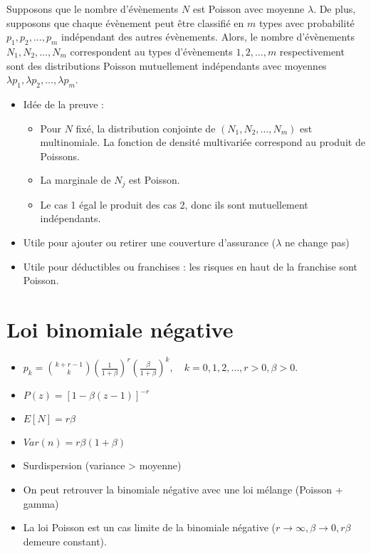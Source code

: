 \begin{theoreme}{}{}
	Supposons que le nombre d'évènements $N$ est Poisson avec moyenne $\lambda$. De plus, supposons que chaque évènement peut être classifié en $m$ types avec probabilité $p_1, p_2, \dots, p_m$ indépendant des autres évènements. Alors, le nombre d'évènements $N_1, N_2, \dots, N_m$ correspondent au types d'évènements $1, 2, \dots, m$ respectivement sont des distributions Poisson mutuellement indépendants avec moyennes $\lambda p_1, \lambda p_2, \dots, \lambda p_m$.
	\tcblower
	\begin{itemize}
		\item Idée de la preuve : 
		\begin{itemize}
			\item Pour $N$ fixé, la distribution conjointe de $(N_1, N_2, \dots, N_m)$ est multinomiale. La fonction de densité multivariée correspond au produit de Poissons. 
			\item La marginale de $N_j$ est Poisson. 
			\item Le cas 1 égal le produit des cas 2, donc ils sont mutuellement indépendants. 
		\end{itemize}
		\item Utile pour ajouter ou retirer une couverture d'assurance ($\lambda$ ne change pas)
		\item Utile pour déductibles ou franchises : les risques en haut de la franchise sont Poisson. 
	\end{itemize}
\end{theoreme}

\section{Loi binomiale négative}

\begin{itemize}
	\item $\displaystyle p_k= \binom{k + r - 1}{k}\left(\frac{1}{1 + \beta}\right)^r \left(\frac{\beta}{1 + \beta}\right)^k, \quad k = 0, 1, 2, \dots, r>0, \beta > 0.$
	\item $\displaystyle P(z) = \left[1 - \beta(z-1)\right]^{-r}$
	\item $E[N] = r\beta$
	\item $Var(n) = r\beta(1 + \beta)$
	\item Surdispersion (variance > moyenne)
	\item On peut retrouver la binomiale négative avec une loi mélange (Poisson + gamma)
	\item La loi Poisson est un cas limite de la binomiale négative ($r\to \infty, \beta \to 0, r\beta$ demeure constant).
\end{itemize}

